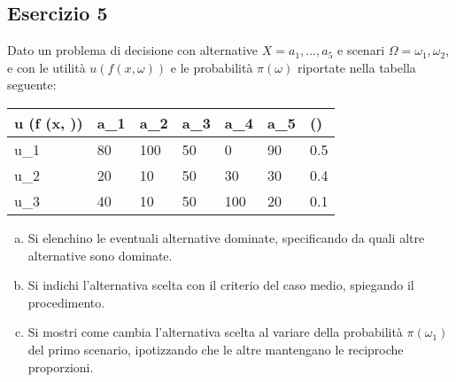 \documentclass[\main/main.tex]{subfiles}
\begin{document}
\subsection{Esercizio 5}
Dato un problema di decisione con alternative $X = {a_1, \ldots , a_5}$ e scenari $\Omega = {\omega_1, \omega_2}$, e con le utilità $u (f (x, \omega))$ e le probabilità $\pi (\omega)$ riportate nella tabella seguente:


\begin{table}
	\begin{tabular}{|L|L|L|L|L|L||L|}
		\hline
		u (f (x, \omega)) & a_1 & a_2 & a_3 & a_4 & a_5 & \pi (\omega) \\
		\hline
		u_1               & 80  & 100 & 50  & 0   & 90  & 0.5          \\
		\hline
		u_2               & 20  & 10  & 50  & 30  & 30  & 0.4          \\
		\hline
		u_3               & 40  & 10  & 50  & 100 & 20  & 0.1          \\
		\hline
	\end{tabular}
\end{table}

\begin{enumerate}[a)]
	\item Si elenchino le eventuali alternative dominate, specificando da quali altre alternative sono dominate.
	\item Si indichi l’alternativa scelta con il criterio del caso medio, spiegando il procedimento.
	\item Si mostri come cambia l’alternativa scelta al variare della probabilità $\pi (\omega_1)$ del primo scenario, ipotizzando che le altre mantengano le reciproche proporzioni.
\end{enumerate}
\end{document}
